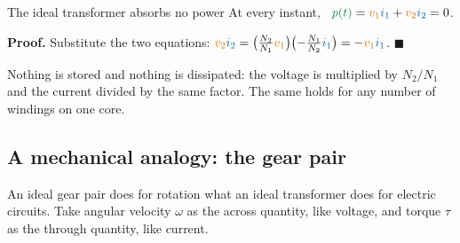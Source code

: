 \documentclass[11pt,a4paper]{article}
\newcommand{\Icol}[1]{\textcolor{ccur}{#1}}
\newcommand{\Vcol}[1]{\textcolor{cvolt}{#1}}
\newcommand{\Pcol}[1]{\textcolor{cpow}{#1}}
\begin{document}
\begin{definitionbox}{The ideal transformer absorbs no power}
At every instant, \ $\Pcol{p(t)} = \Vcol{v_1}\Icol{i_1} + \Vcol{v_2}\Icol{i_2} = 0$.
\end{definitionbox}

\textbf{Proof.} Substitute the two equations:
$\Vcol{v_2}\Icol{i_2} = \bigl(\tfrac{N_2}{N_1}\Vcol{v_1}\bigr)\bigl(-\tfrac{N_1}{N_2}\Icol{i_1}\bigr)
= -\Vcol{v_1}\Icol{i_1}$. \hfill$\blacksquare$

Nothing is stored and nothing is dissipated: the voltage is multiplied by $N_2/N_1$ and the
current divided by the same factor. The same holds for any number of windings on one core.

\subsection{A mechanical analogy: the gear pair}

An ideal gear pair does for rotation what an ideal transformer does for electric circuits.
Take angular velocity $\omega$ as the across quantity, like voltage, and torque $\tau$ as
the through quantity, like current.
\end{document}
